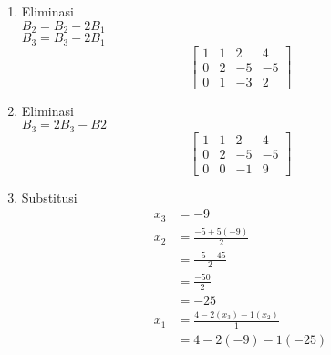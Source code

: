 \documentclass[xcolor=table]{uofa-eng-assignment}
\begin{document}
\begin{enumerate}
\begin{enumerate}
                    \begin{enumerate}
                        \item Eliminasi\\
                              $B_2 = B_2 - 2B_1$ \\
                              $B_3 = B_3 - 2B_1$
                              \begin{equation}
                                  \begin{bmatrix}
                                      1 & 1 & 2  & 4  \\
                                      0 & 2 & -5 & -5 \\
                                      0 & 1 & -3 & 2
                                  \end{bmatrix}
                              \end{equation}
                        \item Eliminasi \\
                              $B_3 = 2B_3 - B2$
                              \begin{equation}
                                  \begin{bmatrix}
                                      1 & 1 & 2  & 4  \\
                                      0 & 2 & -5 & -5 \\
                                      0 & 0 & -1 & 9
                                  \end{bmatrix}
                              \end{equation}
                        \item Substitusi
                              \begin{equation}
                                  \begin{split}
                                      x_3 & = -9 \\
                                      x_2 & = \frac{-5+5(-9)}{2} \\
                                      & = \frac{-5-45}{2} \\
                                      & = \frac{-50}{2} \\
                                      & = -25 \\
                                      x_1 & = \frac{4-2(x_3)-1(x_2)}{1} \\
                                      & = 4-2(-9)-1(-25) \\

\end{split}
\end{equation}
\end{enumerate}
\end{enumerate}
\end{enumerate}
\end{document}
